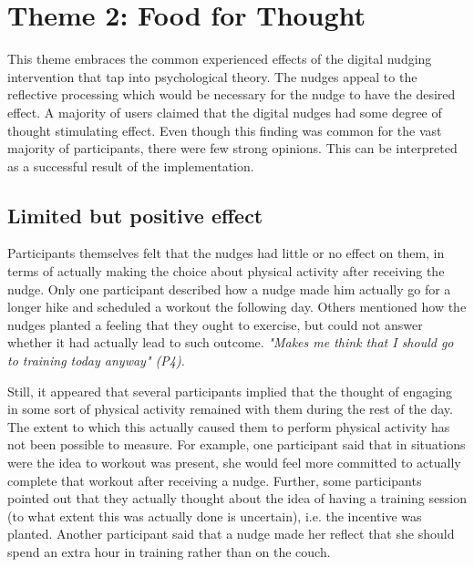 \section{Theme 2: Food for Thought }
This theme embraces the common experienced effects of the digital nudging intervention that tap into psychological theory. The nudges appeal to the reflective processing which would be necessary for the nudge to have the desired effect. A majority of users claimed that the digital nudges had some degree of thought stimulating effect. Even though this finding was common for the vast majority of participants, there were few strong opinions. This can be interpreted as a successful result of the implementation. 

\subsection{Limited but positive effect }
Participants themselves felt that the nudges had little or no effect on them, in terms of actually making the choice about physical activity after receiving the nudge. Only one participant described how a nudge made him actually go for a longer hike and scheduled a workout the following day. Others mentioned how the nudges planted a feeling that they ought to exercise, but could not answer whether it had actually lead to such outcome. \textit{"Makes me think that I should go to training today anyway" (P4).}

Still, it appeared that several participants implied that the thought of engaging in some sort of physical activity remained with them during the rest of the day. The extent to which this actually caused them to perform physical activity has not been possible to measure. For example, one participant said that in situations were the idea to workout was present, she would feel more committed to actually complete that workout after receiving a nudge. Further, some participants pointed out that they actually thought about the idea of having a training session (to what extent this was actually done is uncertain), i.e. the incentive was planted. Another participant said that a nudge made her reflect that she should spend an extra hour in training rather than on the couch. 


